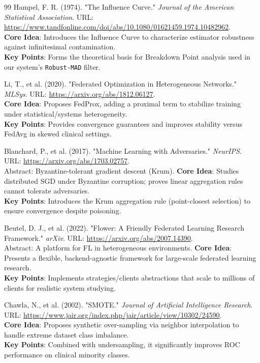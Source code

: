 \documentclass[10pt, a4paper, twocolumn]{article}
\begin{document}
\begin{thebibliography}{99}
 Hampel, F. R. (1974). "The Influence Curve." \textit{Journal of the American Statistical Association}. URL: \url{https://www.tandfonline.com/doi/abs/10.1080/01621459.1974.10482962}. \\
\textbf{Core Idea}: Introduces the Influence Curve to characterize estimator robustness against infinitesimal contamination. \\
\textbf{Key Points}: Forms the theoretical basis for Breakdown Point analysis used in our system's \texttt{Robust-MAD} filter.

 Li, T., et al. (2020). "Federated Optimization in Heterogeneous Networks." \textit{MLSys}. URL: \url{https://arxiv.org/abs/1812.06127}. \\
\textbf{Core Idea}: Proposes FedProx, adding a proximal term to stabilize training under statistical/systems heterogeneity. \\
\textbf{Key Points}: Provides convergence guarantees and improves stability versus FedAvg in skewed clinical settings.

 Blanchard, P., et al. (2017). "Machine Learning with Adversaries." \textit{NeurIPS}. URL: \url{https://arxiv.org/abs/1703.02757}. \\ Abstract: Byzantine-tolerant gradient descent (Krum).
\textbf{Core Idea}: Studies distributed SGD under Byzantine corruption; proves linear aggregation rules cannot tolerate adversaries. \\
\textbf{Key Points}: Introduces the Krum aggregation rule (point-closest selection) to ensure convergence despite poisoning.

 Beutel, D. J., et al. (2022). "Flower: A Friendly Federated Learning Research Framework." \textit{arXiv}. URL: \url{https://arxiv.org/abs/2007.14390}. \\ Abstract: A platform for FL in heterogeneous environments.
\textbf{Core Idea}: Presents a flexible, backend-agnostic framework for large-scale federated learning research. \\
\textbf{Key Points}: Implements strategies/clients abstractions that scale to millions of clients for realistic system studying.

 Chawla, N., et al. (2002). "SMOTE." \textit{Journal of Artificial Intelligence Research}. URL: \url{https://www.jair.org/index.php/jair/article/view/10302/24590}. \\
\textbf{Core Idea}: Proposes synthetic over-sampling via neighbor interpolation to handle extreme dataset class imbalance. \\
\textbf{Key Points}: Combined with undersampling, it significantly improves ROC performance on clinical minority classes.


\end{thebibliography}
\end{document}
